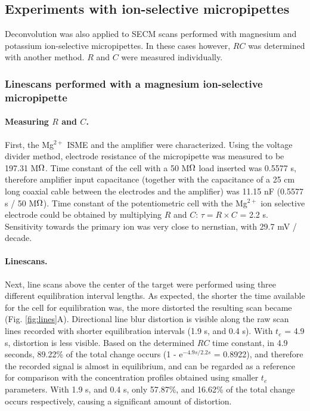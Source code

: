 		\subsection{Experiments with ion-selective micropipettes}
Deconvolution was also applied to SECM scans performed with magnesium and potassium ion-selective micropipettes.
In these cases however, $RC$ was determined with another method.
$R$ and $C$ were measured individually.

			\subsubsection{Linescans performed with a magnesium ion-selective micropipette} 
				\paragraph{Measuring $R$ and $C$.}

First, the Mg$^{2+}$ ISME and the amplifier were characterized.
Using the voltage divider method, electrode resistance of the micropipette was measured to be 197.31 M$\ohm$.
Time constant of the cell with a 50 M$\ohm$ load inserted was 0.5577 s, therefore amplifier input capacitance (together with the capacitance of a 25 cm long coaxial cable between the electrodes and the amplifier) was 11.15 nF (0.5577 s / 50 M$\ohm$).
Time constant of the potentiometric cell with the Mg$^{2+}$ ion selective electrode could be obtained by multiplying $R$ and $C$: $\tau = R\times C$ = 2.2 s.
Sensitivity towards the primary ion was very close to nernstian, with 29.7 mV / decade.

				\paragraph{Linescans.}
Next, line scans above the center of the target were performed using three different equilibration interval lengths.
As expected, the shorter the time available for the cell for equilibration was, the more distorted the resulting scan became (Fig. \ref{fig:lines}A).
Directional line blur distortion is visible along the raw scan lines recorded with shorter equilibration intervals (1.9 s, and 0.4 s).
With $t_e$ = 4.9 s, distortion is less visible.
Based on the determined $RC$ time constant, in 4.9 seconds, 89.22\% of the total change occurs (1 - e$^{-4.9 s / 2.2 s}$ = 0.8922), and therefore the recorded signal is almost in equilibrium, and can be regarded as a reference for comparison with the concentration profiles obtained using smaller $t_e$ parameters.
With 1.9 s, and 0.4 s, only 57.87\%, and 16.62\% of the total change occurs respectively, causing a significant amount of distortion.

